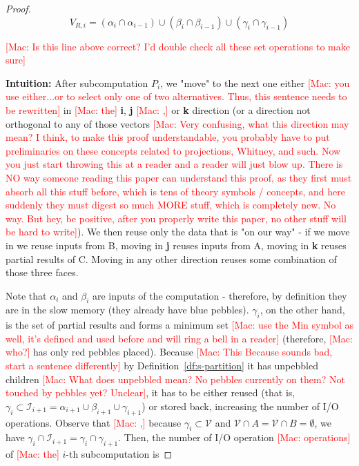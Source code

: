 \documentclass[sigplan,review,anonymous]{acmart}\settopmatter{printfolios=true,printccs=false,printacmref=false}
\newcommand\mac[1]{\textcolor{red}{[Mac: #1]}}
\begin{document}
\begin{proof}
$$V_{R,i} = (\alpha_i \cap \alpha_{i-1}) \cup (\beta_i \cap
\beta_{i-1}) \cup (\gamma_i \cap \gamma_{i-1}) $$

\mac{Is this line above correct? I'd double check all these set operations
to make sure}

\textbf{Intuition:} After subcomputation $P_i$, we "move" to the next one
either \mac{you use either...or to select only one of two alternatives. Thus,
this sentence needs to be rewritten} in \mac{the} \textbf{i}, \textbf{j}
\mac{,} or \textbf{k} direction (or a direction not orthogonal to any of those
vectors \mac{Very confusing, what this direction may mean? I think, to make
this proof understandable, you probably have to put preliminaries on these concepts
related to projections, Whitney, and such.  Now you just start throwing this at
a reader and a reader will just blow up. There is NO way someone reading this
paper can understand this proof, as they first must absorb all this stuff
before, which is tens of theory symbols / concepts, and here suddenly they must
digest so much MORE stuff, which is completely new. No way. But hey, be
positive, after you properly write this paper, no other stuff will be hard to
write}). We then reuse only the data that is "on our way" - if we move in
 we reuse inputs from B, moving in \textbf{j} reuses inputs from A,
moving in \textbf{k} reuses partial results of C. Moving in any other direction
reuses some combination of those three faces.

Note that $\alpha_i$ and $\beta_i$ are inputs of the computation - therefore,
by definition they are in the slow memory (they already have blue pebbles).
$\gamma_i$, on the other hand, is the set of partial results and forms a
minimum set \mac{use the Min symbol as well, it's defined and used before and
will ring a bell in a reader} (therefore, \mac{who?} has only red pebbles
placed). Because \mac{This Because sounds bad, start a sentence differently} by
Definition~\ref{df:s-partition} it has unpebbled children \mac{What does
unpebbled mean? No pebbles currently on them? Not touched by pebbles yet?
Unclear}, it has to be either reused (that is, $\gamma_i \subset
\mathcal{I}_{i+1} =  \alpha_{i+1} \cup \beta_{i+1} \cup \gamma_{i+1}$) or
stored back, increasing the number of I/O operations. Observe that \mac{,}
because $\gamma_i \subset \mathcal{V}$ and $\mathcal{V} \cap A = \mathcal{V}
\cap B = \emptyset$, we have $\gamma_i \cap \mathcal{I}_{i+1} =  \gamma_i \cap
\gamma_{i+1}$. Then, the number of I/O operation \mac{operations} of \mac{the}
$i$-th subcomputation is
 

\end{proof}
\end{document}
